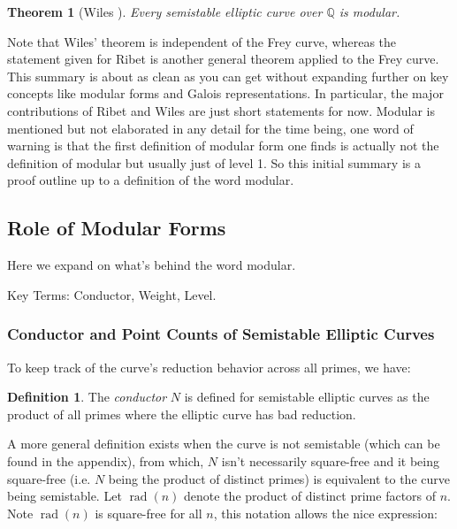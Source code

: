 \documentclass{article}
\newtheorem{thm}{Theorem}[section]
\theoremstyle{definition}
\newtheorem{definition}{Definition}[section]
\theoremstyle{definition}
\theoremstyle{definition}
\newcommand{\rad}{\operatorname{rad}}
\newcommand{\Q}{\mathbb{Q}}
\begin{document}
\begin{thm}[Wiles \cite{Wiles}]
     Every semistable elliptic curve over $\Q$ is modular.
\end{thm}

Note that Wiles' theorem is independent of the Frey curve, whereas the statement given for Ribet is another general theorem applied to the Frey curve. This summary is about as clean as you can get without expanding further on key concepts like modular forms and Galois representations. In particular, the major contributions of Ribet and Wiles are just short statements for now.
\newline\newline
Modular is mentioned but not elaborated in any detail for the time being, one word of warning is that the first definition of modular form one finds is actually not the definition of modular but usually just of level 1. So this initial summary is a proof outline up to a definition of the word modular.



\subsection{Role of Modular Forms}

Here we expand on what's behind the word modular.

Key Terms: Conductor, Weight, Level.

\subsubsection{Conductor and Point Counts of Semistable Elliptic Curves}
To keep track of the curve’s reduction behavior across all primes, we have:
\begin{definition}The \emph{conductor} $N$ is defined for semistable elliptic curves as the product of all primes where the elliptic curve has bad reduction.
\end{definition}
A more general definition exists when the curve is not semistable (which can be found in the appendix), from which, $N$ isn't necessarily square-free and it being square-free (i.e. $N$ being the product of distinct primes) is equivalent to the curve being semistable. 
\newline\newline
Let $\rad(n)$ denote the product of distinct prime factors of $n$. Note $\rad(n)$ is square-free for all $n$, this notation allows the nice expression:
\end{document}
